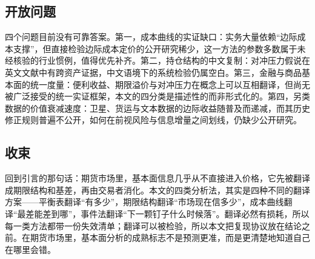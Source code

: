 \documentclass[12pt,a4paper]{ctexart}
\begin{document}
\subsection{开放问题}

四个问题目前没有可靠答案。第一，成本曲线的实证缺口：实务大量依赖“边际成本支撑”，但直接检验边际成本定价的公开研究稀少，这一方法的参数多数属于未经核验的行业惯例，值得优先补齐。第二，持仓结构的中文复制：对冲压力假说在英文文献中有跨资产证据，中文语境下的系统检验仍属空白。第三，金融与商品基本面的统一度量：便利收益、期限溢价与对冲压力在概念上可以互相翻译，但尚无被广泛接受的统一实证框架，本文的四分类是描述性的而非形式化的。第四，另类数据的价值衰减速度：卫星、货运与文本数据的边际收益随普及而递减，而其历史修正规则普遍不公开，如何在前视风险与信息增量之间划线，仍缺少公开研究。

\subsection{收束}

回到引言的那句话：期货市场里，基本面信息几乎从不直接进入价格，它先被翻译成期限结构和基差，再由交易者消化。本文的四类分析法，其实是四种不同的翻译方案——平衡表翻译“有多少”，期限结构翻译“市场现在信多少”，成本曲线翻译“最差能差到哪”，事件法翻译“下一颗钉子什么时候落”。翻译必然有损耗，所以每一类方法都带一份失效清单；翻译可以被检验，所以本文把复现协议放在结论之前。在期货市场里，基本面分析的成熟标志不是预测更准，而是更清楚地知道自己在哪里会错。
\end{document}
